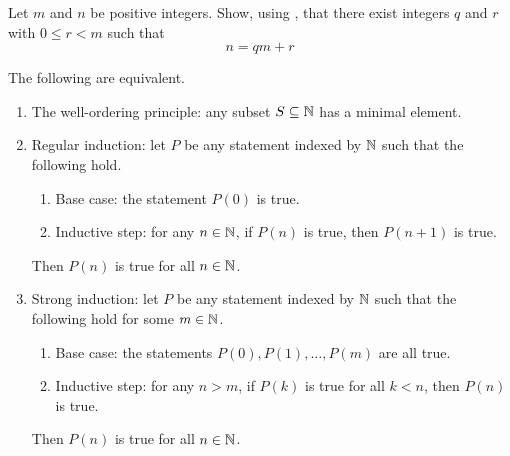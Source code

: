 \documentclass[../notes.tex]{subfiles}
\begin{document}
\begin{exercise}
    Let $m$ and $n$ be positive integers. Show, using , that there exist integers $q$ and $r$ with $0 \leq r < m$ such that
    \begin{equation*}
        n = qm + r
    \end{equation*}
\end{exercise}
\begin{theorem} \label{thm:well-order-equivs}
    The following are equivalent.
    \begin{enumerate}[label=(\alph*)]
        \item The well-ordering principle: any subset $S\subseteq\mathbb N$ has a minimal element.
        \item Regular induction: let $P$ be any statement indexed by $\mathbb N$ such that the following hold.
        \begin{enumerate}[label=\arabic*.]
            \item Base case: the statement $P(0)$ is true.
            \item Inductive step: for any $n\in\mathbb N$, if $P(n)$ is true, then $P(n+1)$ is true.
        \end{enumerate}
        Then $P(n)$ is true for all $n\in\mathbb N$.
        \item Strong induction: let $P$ be any statement indexed by $\mathbb N$ such that the following hold for some $m\in\mathbb N$.
        \begin{enumerate}[label=\arabic*.]
            \item Base case: the statements $P(0),P(1),\ldots,P(m)$ are all true.
            \item Inductive step: for any $n>m$, if $P(k)$ is true for all $k<n$, then $P(n)$ is true.
        \end{enumerate}
        Then $P(n)$ is true for all $n\in\mathbb N$.
    \end{enumerate}
\end{theorem}
\end{document}
